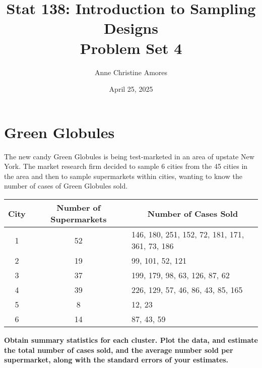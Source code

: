 \documentclass[]{article}
\author{}
\date{\vspace{-2.5em}}
\title{Stat 138: Introduction to Sampling Designs \\ Problem Set 4}
\author{Anne Christine Amores}
\date{April 25, 2025}
\begin{document}
\maketitle

\section{Green Globules}

The new candy Green Globules is being test-marketed in an area of upstate New York. The market research firm decided to sample 6 cities from the 45 cities in the area and then to sample supermarkets within cities, wanting to know the number of cases of Green Globules sold.

\begin{table}[h!]
\centering
\begin{tabular}{|c|c|l|}
\hline
\textbf{City} & \textbf{Number of Supermarkets} & \multicolumn{1}{c|}{\textbf{Number of Cases Sold}} \\
\hline
1 & 52 & 146, 180, 251, 152, 72, 181, 171, 361, 73, 186 \\
2 & 19 & 99, 101, 52, 121 \\
3 & 37 & 199, 179, 98, 63, 126, 87, 62 \\
4 & 39 & 226, 129, 57, 46, 86, 43, 85, 165 \\
5 & 8  & 12, 23 \\
6 & 14 & 87, 43, 59 \\
\hline
\end{tabular}
\label{tab:green-globules}
\end{table}
 
\textbf{Obtain summary statistics for each cluster. Plot the data, and estimate the total number of cases sold, and the average number sold per supermarket, along with the standard errors of your estimates.}
\end{document}
